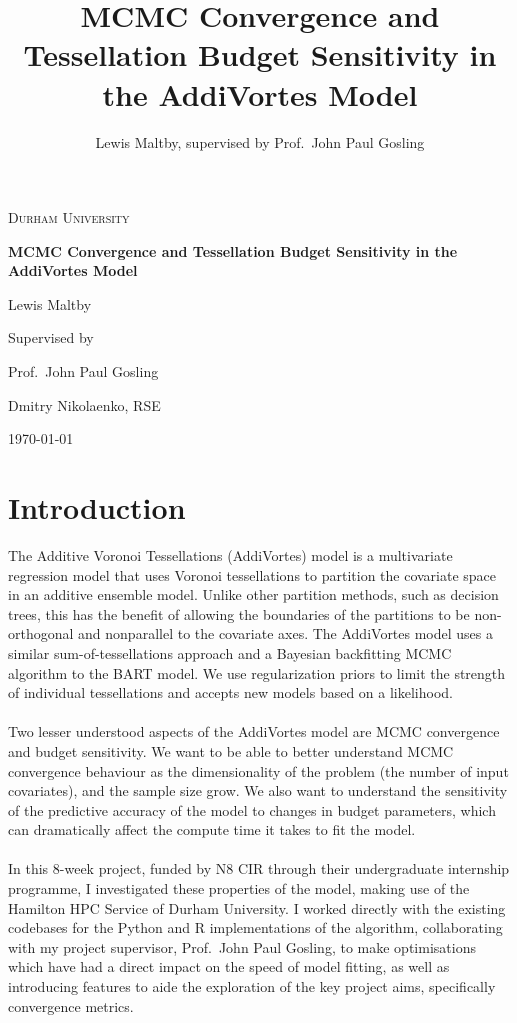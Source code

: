 \documentclass[11pt,twoside,a4paper]{article}
\title{MCMC Convergence and Tessellation Budget Sensitivity
in the AddiVortes Model}
\author{Lewis Maltby, supervised by Prof.\ John Paul Gosling}
\begin{document}
\begin{titlepage}
    \centering
    
    {\scshape\LARGE Durham University \par}
    \vspace{1.5cm}
    
    {\huge\bfseries MCMC Convergence and Tessellation Budget Sensitivity
in the AddiVortes Model\par}
    \vspace{2cm}
    
    {\Large Lewis Maltby\par}
    \vspace{1cm}
    
    \vfill
    
    {\large Supervised by\par}
    {\Large Prof.\ John Paul Gosling\par}
	{\Large Dmitry Nikolaenko, RSE\par}    
    
    \vfill
    
    {\large \today\par}

\end{titlepage}
\setcounter{page}{1}
\section{Introduction}
The Additive Voronoi Tessellations (AddiVortes) model is a multivariate regression model that uses Voronoi tessellations to partition the covariate space in an additive ensemble model. Unlike other partition methods, such as decision trees, this has the benefit of allowing the boundaries of the partitions to be non-orthogonal and nonparallel to the covariate axes. The AddiVortes model uses a similar sum-of-tessellations approach and a Bayesian backfitting MCMC algorithm to the BART model. We use regularization priors to limit the strength of individual tessellations and accepts new models based on a likelihood.\cite{main-paper}
\\\\
Two lesser understood aspects of the AddiVortes model are MCMC convergence and budget sensitivity. We want to be able to better understand MCMC convergence behaviour as the dimensionality of the problem (the number of input covariates), and the sample size grow. We also want to understand the sensitivity of the predictive accuracy of the model to changes in budget parameters, which can dramatically affect the compute time it takes to fit the model.
\\\\
In this 8-week project, funded by N8 CIR through their undergraduate internship programme, I investigated these properties of the model, making use of the Hamilton HPC Service of Durham University. I worked directly with the existing codebases for the Python and R implementations of the algorithm, collaborating with my project supervisor, Prof.\ John Paul Gosling, to make optimisations which have had a direct impact on the speed of model fitting, as well as introducing features to aide the exploration of the key project aims, specifically convergence metrics.
\end{document}
